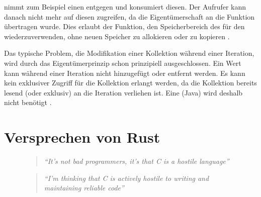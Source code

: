  nimmt zum Beispiel einen  entgegen und konsumiert diesen.
Der Aufrufer kann danach nicht mehr auf diesen zugreifen, da die Eigentümerschaft an die Funktion  übertragen wurde.
Dies erlaubt der Funktion, den Speicherbereich des  für den  wiederzuverwenden, ohne neuen Speicher zu allokieren oder zu kopieren \cite{rust:string:from_utf8}.

Das typische Problem, die Modifikation einer Kollektion während einer Iteration, wird durch das Eigentümerprinzip schon prinzipiell ausgeschlossen.
Ein Wert kann während einer Iteration nicht hinzugefügt oder entfernt werden.
Es kann kein exklusiver Zugriff für die Kollektion erlangt werden, da die Kollektion bereits lesend (oder exklusiv) an die Iteration verliehen ist.
Eine  (Java)  wird deshalb nicht benötigt \cite[116]{rust:orly_programming}.





\label{rust:oop}





\section{Versprechen von Rust}
\label{rust:guarantees}

\begin{figure}[H]
	\begin{quotation}
		\textit{\enquote{It’s not bad programmers, it’s that C is a hostile language}} 
		\cite[54]{rust:c_is_hostile_mena}
	\end{quotation}
	
	\begin{quotation}
		\textit{\enquote{I’m thinking that C is actively hostile to writing and maintaining reliable code}} 
		\cite[129]{rust:c_is_hostile_mena}
	\end{quotation}
\end{figure}

